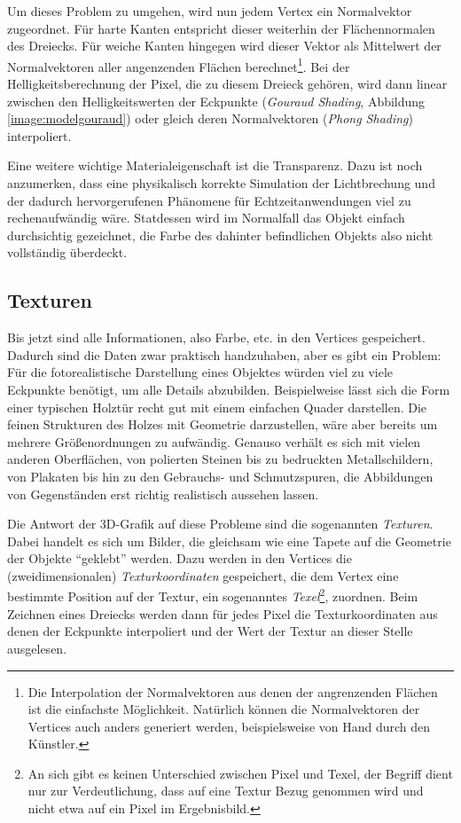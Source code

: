 Um dieses Problem zu umgehen, wird nun jedem Vertex ein Normalvektor zugeordnet. Für harte Kanten entspricht dieser weiterhin der Flächennormalen des Dreiecks. Für weiche Kanten hingegen wird dieser Vektor als Mittelwert der Normalvektoren aller angenzenden Flächen berechnet\footnote{Die Interpolation der Normalvektoren aus denen der angrenzenden Flächen ist die einfachste Möglichkeit. Natürlich können die Normalvektoren der Vertices auch anders generiert werden, beispielsweise von Hand durch den Künstler.}. Bei der Helligkeitsberechnung der Pixel, die zu diesem Dreieck gehören, wird dann linear zwischen den Helligkeitswerten der Eckpunkte (\emph{Gouraud Shading}, Abbildung \ref{image:modelgouraud}) oder gleich deren Normalvektoren (\emph{Phong Shading}) interpoliert.

Eine weitere wichtige Materialeigenschaft ist die Transparenz. Dazu ist noch anzumerken, dass eine physikalisch korrekte Simulation der Lichtbrechung und der dadurch hervorgerufenen Phänomene für Echtzeitanwendungen viel zu rechenaufwändig wäre. Statdessen wird im Normalfall das Objekt einfach durchsichtig gezeichnet, die Farbe des dahinter befindlichen Objekts also nicht vollständig überdeckt.

\subsection{Texturen}
\label{texturing}
Bis jetzt sind alle Informationen, also Farbe, etc. in den Vertices gespeichert. Dadurch sind die Daten zwar praktisch handzuhaben, aber es gibt ein Problem: Für die fotorealistische Darstellung eines Objektes würden viel zu viele Eckpunkte benötigt, um alle Details abzubilden. Beispielweise lässt sich die Form einer typischen Holztür recht gut mit einem einfachen Quader darstellen. Die feinen Strukturen des Holzes mit Geometrie darzustellen, wäre aber bereits um mehrere Größenordnungen zu aufwändig. Genauso verhält es sich mit vielen anderen Oberflächen, von polierten Steinen bis zu bedruckten Metallschildern, von Plakaten bis hin zu den Gebrauchs- und Schmutzspuren, die Abbildungen von Gegenständen erst richtig realistisch aussehen lassen.

Die Antwort der 3D-Grafik auf diese Probleme sind die sogenannten \emph{Texturen}. Dabei handelt es sich um Bilder, die gleichsam wie eine Tapete auf die Geometrie der Objekte \enquote{geklebt} werden. Dazu werden in den Vertices die (zweidimensionalen) \emph{Texturkoordinaten} gespeichert, die dem Vertex eine bestimmte Position auf der Textur, ein sogenanntes \emph{Texel}\footnote{An sich gibt es keinen Unterschied zwischen Pixel und Texel, der Begriff dient nur zur Verdeutlichung, dass auf eine Textur Bezug genommen wird und nicht etwa auf ein Pixel im Ergebnisbild.}, zuordnen. Beim Zeichnen eines Dreiecks werden dann für jedes Pixel die Texturkoordinaten aus denen der Eckpunkte interpoliert und der Wert der Textur an dieser Stelle ausgelesen.

